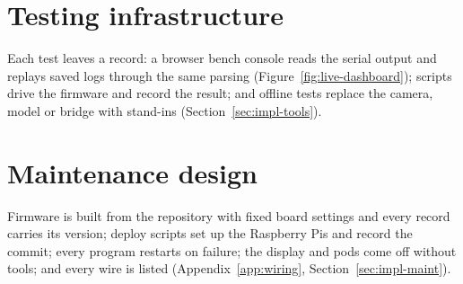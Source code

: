 \section{Testing infrastructure}
\label{sec:bench-tools}

Each test leaves a record: a browser bench console reads the serial output and replays saved logs through the same parsing (Figure~\ref{fig:live-dashboard}); scripts drive the firmware and record the result; and offline tests replace the camera, model or bridge with stand-ins (Section~\ref{sec:impl-tools}).

\section{Maintenance design}
\label{sec:maintenance}

Firmware is built from the repository with fixed board settings and every record carries its version; deploy scripts set up the Raspberry Pis and record the commit; every program restarts on failure; the display and pods come off without tools; and every wire is listed (Appendix~\ref{app:wiring}, Section~\ref{sec:impl-maint}).

